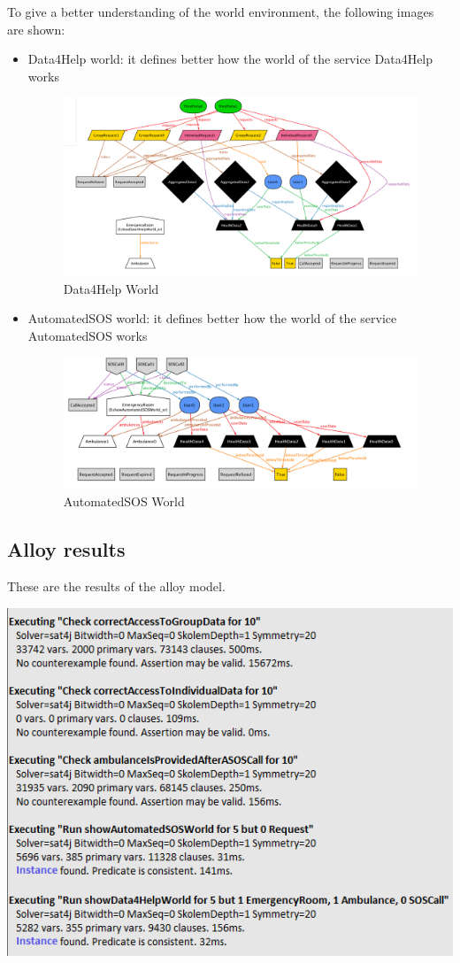To give a better understanding of the world environment, the following images are shown:
\begin{itemize}
\item Data4Help world: it defines better how the world of the service Data4Help works
\begin{figure}[H]
\includegraphics[width=\linewidth]{Images/world1}
\caption{ Data4Help World }
\label{fig:world1}
\end{figure}

\item AutomatedSOS world: it defines better how the world of the service AutomatedSOS works
\begin{figure}[H]
\includegraphics[width=\linewidth]{Images/world2}
\caption{ AutomatedSOS World }
\label{fig:world2}
\end{figure}
 

\end{itemize}
\subsection{Alloy results}
These are the results of the alloy model.

\begin{center}
\centering
\includegraphics[width=1\textwidth]{Images/alloyResults}
\end{center}